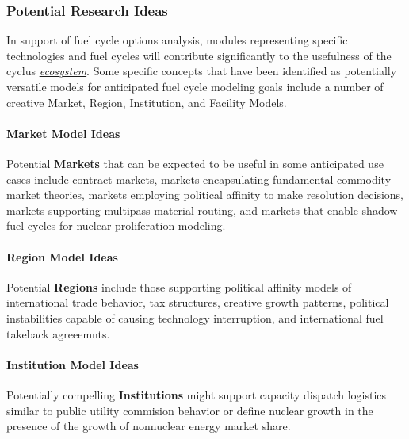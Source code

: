 \documentclass[letterpaper,10pt,english]{sphinxmanual}
\begin{document}
\subsubsection{Potential Research Ideas}
\label{basics/roadmap:potential-research-ideas}
In support of fuel cycle options analysis, modules representing specific
technologies and fuel cycles will contribute significantly to the usefulness of
the cyclus {\hyperref[basics/ecosystem::doc]{\emph{ecosystem}}}. Some specific concepts that have been identified as
potentially versatile models for anticipated fuel cycle modeling goals include a
number of creative Market, Region, Institution, and Facility Models.


\paragraph{Market Model Ideas}
\label{basics/roadmap:market-model-ideas}
Potential \textbf{Markets} that can be expected to be useful in some anticipated
use cases include contract markets, markets encapsulating fundamental commodity
market theories, markets employing political affinity to make resolution
decisions, markets supporting multipass material routing, and markets that
enable shadow fuel cycles for nuclear proliferation modeling.


\paragraph{Region Model Ideas}
\label{basics/roadmap:region-model-ideas}
Potential \textbf{Regions} include those supporting political affinity models of
international trade behavior, tax structures, creative growth patterns, political
instabilities capable of causing technology interruption, and international fuel
takeback agreeemnts.


\paragraph{Institution Model Ideas}
\label{basics/roadmap:institution-model-ideas}
Potentially compelling \textbf{Institutions} might support capacity dispatch logistics
similar to public utility commision behavior or define nuclear growth in the
presence of the growth of nonnuclear energy market share.
\end{document}
